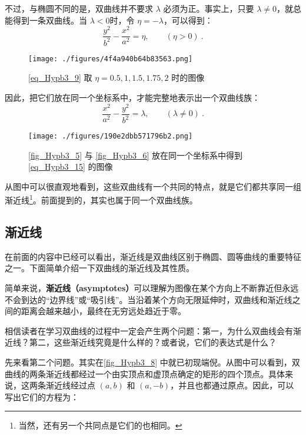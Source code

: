 不过，与椭圆不同的是，双曲线并不要求 $\lambda$ 必须为正。事实上，只要 $\lambda\neq0$，就总能得到一条双曲线。当 $\lambda<0$时，令 $\eta=-\lambda$，可以得到：
\begin{equation}\label{eq_Hypb3_9}
\frac{y^2}{b^2}-\frac{x^2}{a^2} = \eta,\qquad(\eta>0)~.
\end{equation}

\begin{figure}[ht]
\centering
\texttt{[image: ./figures/4f4a940b64b83563.png]}
\caption{\autoref{eq_Hypb3_9} 取 $\eta=0.5,1,1.5,1.75,2$ 时的图像} \label{fig_Hypb3_6}
\end{figure}

因此，把它们放在同一个坐标系中，才能完整地表示出一个双曲线族：
\begin{equation}\label{eq_Hypb3_15}
\frac{x^2}{a^2} - \frac{y^2}{b^2} = \lambda,\qquad(\lambda\neq0)~.
\end{equation}

\begin{figure}[ht]
\centering
\texttt{[image: ./figures/190e2dbb571796b2.png]}
\caption{\autoref{fig_Hypb3_5} 与 \autoref{fig_Hypb3_6} 放在同一个坐标系中得到 \autoref{eq_Hypb3_15} 的图像} \label{fig_Hypb3_7}
\end{figure}

从图中可以很直观地看到，这些双曲线有一个共同的特点，就是它们都共享同一组渐近线\footnote{当然，还有另一个共同点是它们的也相同。}。前面提到的，其实也属于同一个双曲线族。

\subsection{渐近线}

在前面的内容中已经可以看出，渐近线是双曲线区别于椭圆、圆等曲线的重要特征之一。下面简单介绍一下双曲线的渐近线及其性质。

简单来说，\textbf{渐近线（asymptotes）}可以理解为图像在某个方向上不断靠近但永远不会到达的“边界线”或“吸引线”。当沿着某个方向无限延伸时，双曲线和渐近线之间的距离会越来越小，最终在无穷远处趋近于零。

相信读者在学习双曲线的过程中一定会产生两个问题：第一，为什么双曲线会有渐近线？第二，这些渐近线究竟是什么样的？或者说，它们的表达式是什么？

先来看第二个问题。其实在\autoref{fig_Hypb3_8} 中就已初现端倪。从图中可以看到，双曲线的两条渐近线都经过一个由实顶点和虚顶点确定的矩形的四个顶点。具体来说，这两条渐近线经过点 $(a,b)$ 和 $(a,-b)$，并且也都通过原点。因此，可以写出它们的方程为：

